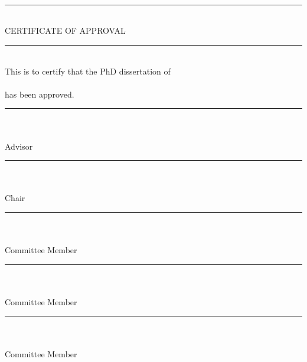 \vspace*{\fill}
\begin{center}
\track\\
\school\\
\institution\\
\doublespaced
\rule{8cm}{1pt}\\
CERTIFICATE OF APPROVAL\\
\rule{8cm}{1pt}\\
\singlespaced
This is to certify that the PhD dissertation of\\
\projectauthor\\
has been approved.\\

\vspace{30pt}
\rule{8cm}{0.5pt}\\
\advisor\\
Advisor\\

\vspace{30pt}
\rule{8cm}{0.5pt}\\
\chair\\
Chair\\

\vspace{30pt}
\rule{8cm}{0.5pt}\\
\memberthree\\
Committee Member\\

\vspace{30pt}
\rule{8cm}{0.5pt}\\
\memberfour\\
Committee Member\\

\vspace{30pt}
\rule{8cm}{0.5pt}\\
\memberfive\\
Committee Member\\

\end{center}
\vspace*{\fill}
\clearpage